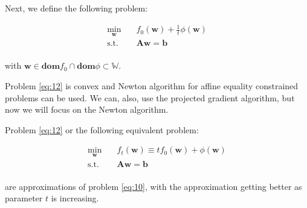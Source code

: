 \documentclass{beamer}
\begin{document}
\begin{frame}

\justifying
Next, we define the following problem:

\justifying
\begin{equation}
\begin{aligned}
\label{eq:12}
\min_{\mathbf{w}} \quad & {f_{0}\left(\mathbf{w}\right) + \frac{1}{t} \phi\left(\mathbf{w}\right)} \\
\textrm{s.t.} \quad & \mathbf{A}\mathbf{w} = \mathbf{b} \\
\end{aligned}
\end{equation}

\justifying
with $\mathbf{w} \in \textbf{dom}f_{0} \cap \textbf{dom}\phi \subset \mathbb{W}$.

\vspace{0.4cm}
\justifying
Problem \eqref{eq:12} is convex and Newton algorithm for affine equality constrained problems can be used. We can, also, use the projected gradient algorithm, but now we will focus on the Newton algorithm.

\vspace{0.4cm}
\justifying
Problem \eqref{eq:12} or the following equivalent problem:

\justifying
\begin{equation}
\begin{aligned}
\label{eq:13}
\min_{\mathbf{w}} \quad & {f_{t}\left(\mathbf{w}\right) \equiv t f_{0}\left(\mathbf{w}\right) + \phi\left(\mathbf{w}\right)} \\
\textrm{s.t.} \quad & \mathbf{A}\mathbf{w} = \mathbf{b} \\
\end{aligned}
\end{equation}

\justifying
are approximations of problem \eqref{eq:10}, with the approximation getting better as parameter $t$ is increasing.

\end{frame}
\end{document}
